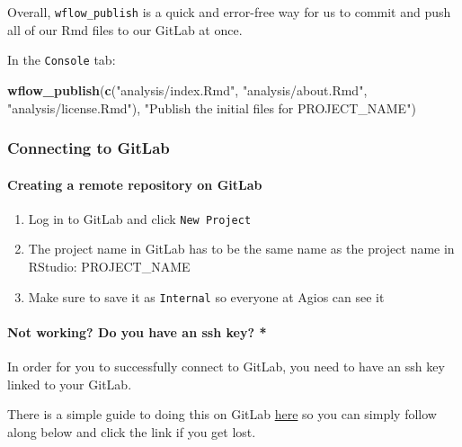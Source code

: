 \documentclass[openany]{article}
\newenvironment{Shaded}{\begin{snugshade}}{\end{snugshade}}
\newcommand{\KeywordTok}[1]{\textcolor[rgb]{0.13,0.29,0.53}{\textbf{#1}}}
\newcommand{\NormalTok}[1]{#1}
\newcommand{\StringTok}[1]{\textcolor[rgb]{0.31,0.60,0.02}{#1}}
\providecommand{\tightlist}{%
  \setlength{\itemsep}{0pt}\setlength{\parskip}{0pt}}
\let\oldparagraph\paragraph
\renewcommand{\paragraph}[1]{\oldparagraph{#1}\mbox{}}
\begin{document}
Overall, \texttt{wflow\_publish} is a quick and error-free way for us to commit and push all of our Rmd files to our GitLab at once.

In the \texttt{Console} tab:

\begin{Shaded}
\begin{Highlighting}[]
\KeywordTok{wflow_publish}\NormalTok{(}\KeywordTok{c}\NormalTok{(}\StringTok{"analysis/index.Rmd"}\NormalTok{, }\StringTok{"analysis/about.Rmd"}\NormalTok{, }\StringTok{"analysis/license.Rmd"}\NormalTok{), }\StringTok{"Publish the initial files for PROJECT_NAME"}\NormalTok{)}
\end{Highlighting}
\end{Shaded}

\hypertarget{connecting-to-gitlab-1}{%
\subsubsection{Connecting to GitLab}\label{connecting-to-gitlab-1}}

\hypertarget{creating-a-remote-repository-on-gitlab}{%
\paragraph{Creating a remote repository on GitLab}\label{creating-a-remote-repository-on-gitlab}}

\begin{enumerate}
\def\labelenumi{\arabic{enumi}.}
\tightlist
\item
  Log in to GitLab and click \texttt{New\ Project}
\item
  The project name in GitLab has to be the same name as the project name in RStudio: PROJECT\_NAME
\item
  Make sure to save it as \texttt{Internal} so everyone at Agios can see it
\end{enumerate}

\hypertarget{not-working-do-you-have-an-ssh-key}{%
\paragraph{Not working? Do you have an ssh key? *}\label{not-working-do-you-have-an-ssh-key}}

In order for you to successfully connect to GitLab, you need to have an ssh key linked to your GitLab.

There is a simple guide to doing this on GitLab \href{http://ceres.agios.com/help/ssh/README\#generating-a-new-ssh-key-pair}{here} so you can simply follow along below and click the link if you get lost.
\end{document}
